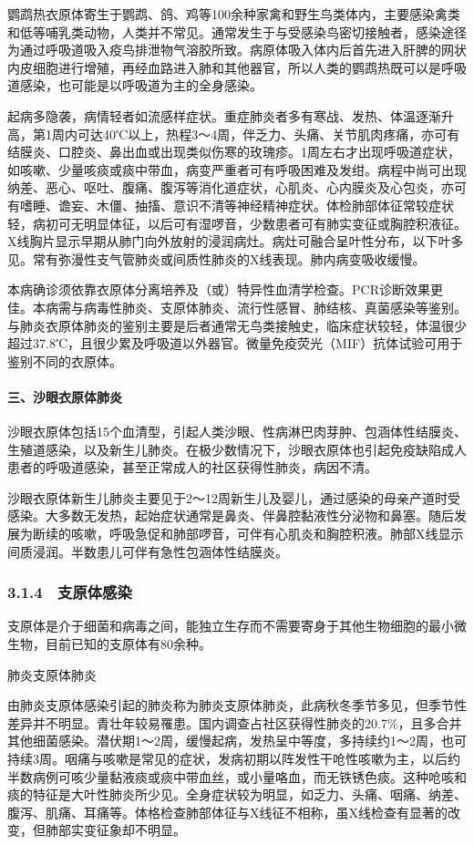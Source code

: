 鹦鹉热衣原体寄生于鹦鹉、鸽、鸡等100余种家禽和野生鸟类体内，主要感染禽类和低等哺乳类动物，人类并不常见。通常发生于与受感染鸟密切接触者，感染途径为通过呼吸道吸入疫鸟排泄物气溶胶所致。病原体吸入体内后首先进入肝脾的网状内皮细胞进行增殖，再经血路进入肺和其他器官，所以人类的鹦鹉热既可以是呼吸道感染，也可能是以呼吸道为主的全身感染。

起病多隐袭，病情轻者如流感样症状。重症肺炎者多有寒战、发热、体温逐渐升高，第1周内可达40℃以上，热程3～4周，伴乏力、头痛、关节肌肉疼痛，亦可有结膜炎、口腔炎、鼻出血或出现类似伤寒的玫瑰疹。1周左右才出现呼吸道症状，如咳嗽、少量咳痰或痰中带血，病变严重者可有呼吸困难及发绀。病程中尚可出现纳差、恶心、呕吐、腹痛、腹泻等消化道症状，心肌炎、心内膜炎及心包炎，亦可有嗜睡、谵妄、木僵、抽搐、意识不清等神经精神症状。体检肺部体征常较症状轻，病初可无明显体征，以后可有湿啰音，少数患者可有肺实变征或胸腔积液征。X线胸片显示早期从肺门向外放射的浸润病灶。病灶可融合呈叶性分布，以下叶多见。常有弥漫性支气管肺炎或间质性肺炎的X线表现。肺内病变吸收缓慢。

本病确诊须依靠衣原体分离培养及（或）特异性血清学检查。PCR诊断效果更佳。本病需与病毒性肺炎、支原体肺炎、流行性感冒、肺结核、真菌感染等鉴别。与肺炎衣原体肺炎的鉴别主要是后者通常无鸟类接触史，临床症状较轻，体温很少超过37.8℃，且很少累及呼吸道以外器官。微量免疫荧光（MIF）抗体试验可用于鉴别不同的衣原体。

\paragraph{三、沙眼衣原体肺炎}

沙眼衣原体包括15个血清型，引起人类沙眼、性病淋巴肉芽肿、包涵体性结膜炎、生殖道感染，以及新生儿肺炎。在极少数情况下，沙眼衣原体也引起免疫缺陷成人患者的呼吸道感染，甚至正常成人的社区获得性肺炎，病因不清。

沙眼衣原体新生儿肺炎主要见于2～12周新生儿及婴儿，通过感染的母亲产道时受感染。大多数无发热，起始症状通常是鼻炎、伴鼻腔黏液性分泌物和鼻塞。随后发展为断续的咳嗽，呼吸急促和肺部啰音，可伴有心肌炎和胸腔积液。肺部X线显示间质浸润。半数患儿可伴有急性包涵体性结膜炎。

\subsubsection{3.1.4　支原体感染}

支原体是介于细菌和病毒之间，能独立生存而不需要寄身于其他生物细胞的最小微生物，目前已知的支原体有80余种。

肺炎支原体肺炎

由肺炎支原体感染引起的肺炎称为肺炎支原体肺炎，此病秋冬季节多见，但季节性差异并不明显。青壮年较易罹患。国内调查占社区获得性肺炎的20.7\%，且多合并其他细菌感染。潜伏期1～2周，缓慢起病，发热呈中等度，多持续约1～2周，也可持续3周。咽痛与咳嗽是常见的症状，发病初期以阵发性干呛性咳嗽为主，以后约半数病例可咳少量黏液痰或痰中带血丝，或小量咯血，而无铁锈色痰。这种呛咳和痰的特征是大叶性肺炎所少见。全身症状较为明显，如乏力、头痛、咽痛、纳差、腹泻、肌痛、耳痛等。体格检查肺部体征与X线征不相称，虽X线检查有显著的改变，但肺部实变征象却不明显。

